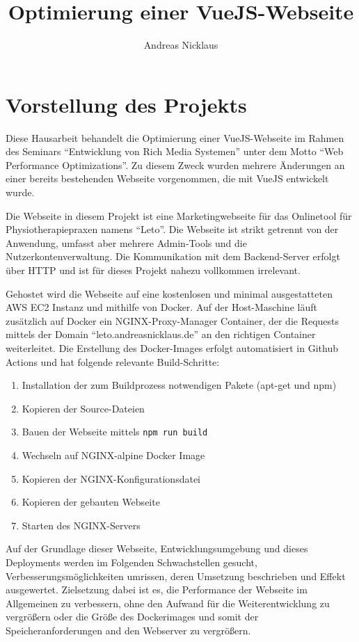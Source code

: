 \documentclass[11pt,a4paper]{article}
\title{Optimierung einer VueJS-Webseite}
\author{Andreas Nicklaus}
\begin{document}
\maketitle

\tableofcontents

\section{Vorstellung des Projekts}
Diese Hausarbeit behandelt die Optimierung einer VueJS-Webseite im Rahmen des Seminars \enquote{Entwicklung von Rich Media Systemen} unter dem Motto \enquote{Web Performance Optimizations}.
Zu diesem Zweck wurden mehrere Änderungen an einer bereits bestehenden Webseite vorgenommen, die mit VueJS entwickelt wurde.

Die Webseite in diesem Projekt ist eine Marketingwebseite für das Onlinetool für Physiotherapiepraxen namens \enquote{Leto}.
Die Webseite ist strikt getrennt von der Anwendung, umfasst aber mehrere Admin-Tools und die Nutzerkontenverwaltung.
Die Kommunikation mit dem Backend-Server erfolgt über HTTP und ist für dieses Projekt nahezu vollkommen irrelevant.

Gehostet wird die Webseite auf eine kostenlosen und minimal ausgestatteten AWS EC2 Instanz und mithilfe von Docker.
Auf der Host-Maschine läuft zusätzlich auf Docker ein NGINX-Proxy-Manager Container, der die Requests mittels der Domain \enquote{leto.andreasnicklaus.de} an den richtigen Container weiterleitet.
Die Erstellung des Docker-Images erfolgt automatisiert in Github Actions und hat folgende relevante Build-Schritte:

\begin{enumerate}
  \item Installation der zum Buildprozess notwendigen Pakete (apt-get und npm)
  \item Kopieren der Source-Dateien
  \item Bauen der Webseite mittels \verb|npm run build|
  \item Wechseln auf NGINX-alpine Docker Image
  \item Kopieren der NGINX-Konfigurationsdatei
  \item Kopieren der gebauten Webseite
  \item Starten des NGINX-Servers
\end{enumerate}

Auf der Grundlage dieser Webseite, Entwicklungsumgebung und dieses Deployments werden im Folgenden Schwachstellen gesucht, Verbesserungsmöglichkeiten umrissen, deren Umsetzung beschrieben und Effekt ausgewertet.
Zielsetzung dabei ist es, die Performance der Webseite im Allgemeinen zu verbessern, ohne den Aufwand für die Weiterentwicklung zu vergrößern oder die Größe des Dockerimages und somit der Speicheranforderungen and den Webserver zu vergrößern.
\end{document}
